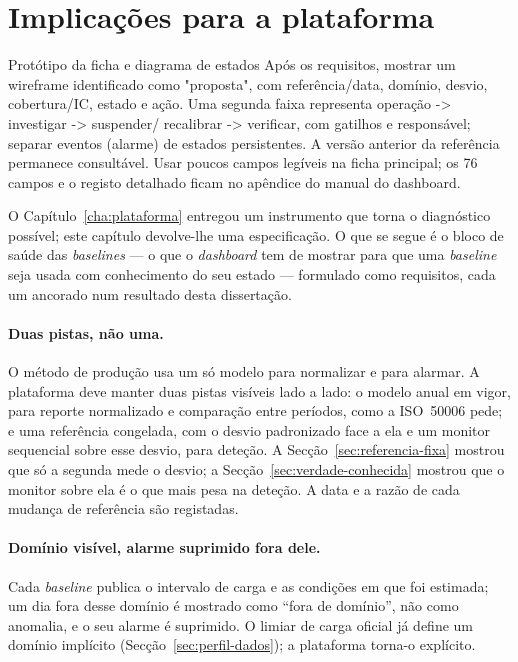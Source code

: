 \section{Implicações para a plataforma}
\label{sec:implicacoes-plataforma}
{Protótipo da ficha e diagrama de estados}
{Após os requisitos, mostrar um wireframe identificado como "proposta",
com referência/data, domínio, desvio, cobertura/IC, estado e ação.
Uma segunda faixa representa operação -\textgreater{} investigar -\textgreater{} suspender/
recalibrar -\textgreater{} verificar, com gatilhos e responsável; separar eventos
(alarme) de estados persistentes. A versão anterior da referência
permanece consultável. Usar poucos campos legíveis na ficha principal;
os 76 campos e o registo detalhado ficam no apêndice do manual do dashboard.}%

O Capítulo~\ref{cha:plataforma} entregou um instrumento que torna o
diagnóstico possível; este capítulo devolve-lhe uma especificação. O que se
segue é o bloco de saúde das \emph{baselines} --- o que o \emph{dashboard}
tem de mostrar para que uma \emph{baseline} seja usada com conhecimento do
seu estado --- formulado como requisitos, cada um ancorado num resultado
desta dissertação.

\paragraph{Duas pistas, não uma.} O método de produção usa um só modelo para
normalizar e para alarmar. A plataforma deve manter duas pistas visíveis
lado a lado: o modelo anual em vigor, para reporte normalizado e comparação
entre períodos, como a ISO~50006 pede; e uma referência congelada, com o
desvio padronizado face a ela e um monitor sequencial sobre esse desvio,
para deteção. A Secção~\ref{sec:referencia-fixa} mostrou que só a segunda
mede o desvio; a Secção~\ref{sec:verdade-conhecida} mostrou que o monitor
sobre ela é o que mais pesa na deteção. A data e a razão de cada mudança de
referência são registadas.

\paragraph{Domínio visível, alarme suprimido fora dele.} Cada
\emph{baseline} publica o intervalo de carga e as condições em que foi
estimada; um dia fora desse domínio é mostrado como ``fora de domínio'', não
como anomalia, e o seu alarme é suprimido. O limiar de carga oficial já
define um domínio implícito (Secção~\ref{sec:perfil-dados}); a plataforma
torna-o explícito.

